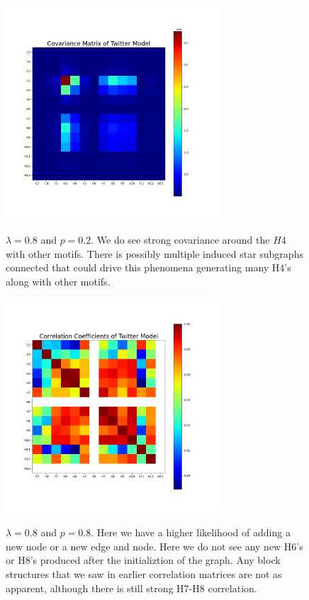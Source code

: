 \begin{figure}
    \includegraphics[width=08cm]{Images/CovMatTwitterModel080209.png}\
    \centering
    \caption{$\lambda=0.8$ and $p=0.2$. We do see strong covariance around the $H4$ with 
    other motifs. There is possibly multiple induced star subgraphs connected that could
    drive this phenomena generating many H4's along with other motifs.}
\end{figure}

\begin{figure}
    \includegraphics[width=08cm]{Images/CorrCoefTwitterModel080809.png}\
    \centering
    \caption{$\lambda=0.8$ and $p=0.8$. Here we have a higher likelihood of adding a new node
    or a new edge and node. Here we do not see any new H6's or H8's produced after the initializtion of 
    the graph. Any block structures that we saw in earlier correlation matrices are not as apparent, although
    there is still strong H7-H8 correlation. }
\end{figure}

